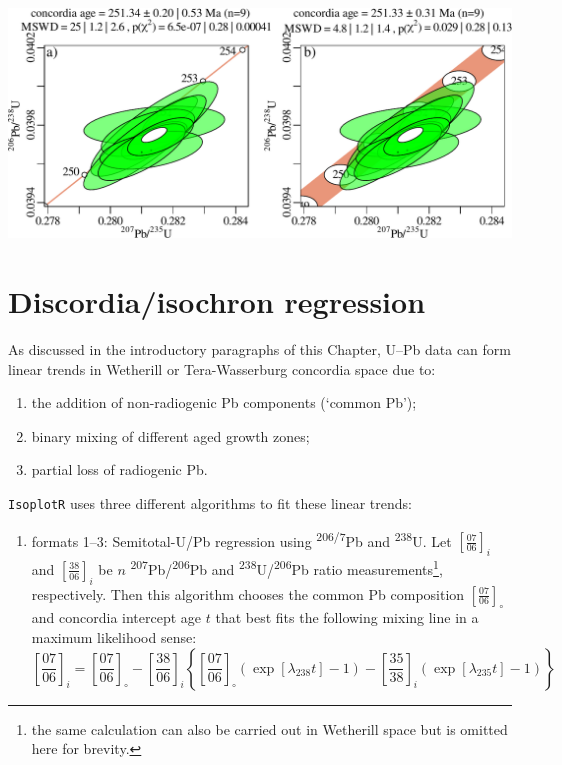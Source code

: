 \begin{refsection}
\begin{center}
\noindent\includegraphics[width=.85\textwidth]{../figures/concexterr.pdf}
\end{center}

\section{Discordia/isochron regression}
\label{sec:discordia}

As discussed in the introductory paragraphs of this Chapter, U--Pb
data can form linear trends in Wetherill or Tera-Wasserburg concordia
space due to:

\begin{enumerate}
\item the addition of non-radiogenic Pb components (`common Pb');
\item binary mixing of different aged growth zones;
\item partial loss of radiogenic Pb.
\end{enumerate}

\texttt{IsoplotR} uses three different algorithms to fit these linear
trends:

\begin{enumerate}
\item formats 1--3: Semitotal-U/Pb regression using
  \textsuperscript{206/7}Pb and \textsuperscript{238}U. Let
  $\left[\frac{07}{06}\right]_i$ and $\left[\frac{38}{06}\right]_i$ be
  $n$ \textsuperscript{207}Pb/\textsuperscript{206}Pb and
  \textsuperscript{238}U/\textsuperscript{206}Pb ratio
  measurements\footnote{the same calculation can also be carried out
    in Wetherill space but is omitted here for brevity.},
  respectively. Then this algorithm chooses the common Pb composition
  $\left[\frac{07}{06}\right]_\circ$ and concordia intercept age $t$
  that best fits the following mixing line in a maximum likelihood
  sense:
  \begin{equation}
    \left[\frac{07}{06}\right]_i = \left[\frac{07}{06}\right]_\circ -
    \left[\frac{38}{06}\right]_i\left\{
    \left[\frac{07}{06}\right]_\circ\left(\exp[\lambda_{238}t]-1\right)
    -\left[\frac{35}{38}\right]_i\left(\exp[\lambda_{235}t]-1\right)
    \right\}
    \label{eq:semitotal-U/Pb}
  \end{equation}


\end{enumerate}
\end{refsection}
